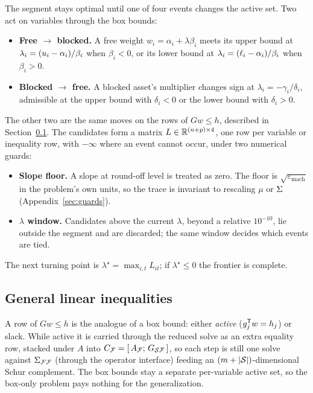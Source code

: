 The segment stays optimal until one of four events changes the active set. Two act on
variables through the box bounds:
\begin{itemize}
\item \textbf{Free $\to$ blocked.} A free weight $w_i = \alpha_i + \lambda\beta_i$ meets
its upper bound at $\lambda_i = (u_i - \alpha_i)/\beta_i$ when $\beta_i < 0$, or its
lower bound at $\lambda_i = (\ell_i - \alpha_i)/\beta_i$ when $\beta_i > 0$.
\item \textbf{Blocked $\to$ free.} A blocked asset's multiplier changes sign at
$\lambda_i = -\gamma_i/\delta_i$, admissible at the upper bound with $\delta_i < 0$ or
the lower bound with $\delta_i > 0$.
\end{itemize}
The other two are the same moves on the rows of $G w \le h$, described in
Section~\ref{sec:ineq}. The candidates form a matrix $L\in\mathbb{R}^{(n+p)\times 4}$, one row per
variable or inequality row, with $-\infty$ where an event cannot occur, under two
numerical guards:
\begin{itemize}
\item \textbf{Slope floor.} A slope at round-off level is treated as zero. The floor is
$\sqrt{\varepsilon_{\text{mach}}}$ in the problem's own units, so the trace is
invariant to rescaling $\mu$ or $\Sigma$ (Appendix~\ref{sec:guards}).
\item \textbf{$\lambda$ window.} Candidates above the current $\lambda$, beyond a
relative $10^{-10}$, lie outside the segment and are discarded; the same window decides
which events are tied.
\end{itemize}
The next turning point is $\lambda^{\star} = \max_{i,t} L_{it}$; if
$\lambda^{\star} \le 0$ the frontier is complete.

\subsection{General linear inequalities}
\label{sec:ineq}

A row of $G w \le h$ is the analogue of a box bound: either \emph{active}
($g_j^{\mathsf{T}} w = h_j$) or slack. While active it is carried through the reduced solve as
an extra equality row, stacked under $A$ into $C_{\mathcal{F}} = [\,A_{\mathcal{F}};\,G_{\mathcal{S}\mathcal{F}}\,]$, so each
step is still one solve against $\Sigma_{\mathcal{F}\mathcal{F}}$ (through the operator interface) feeding
an $(m+|\mathcal{S}|)$-dimensional Schur complement. The box bounds stay a separate per-variable
active set, so the box-only problem pays nothing for the generalization.


